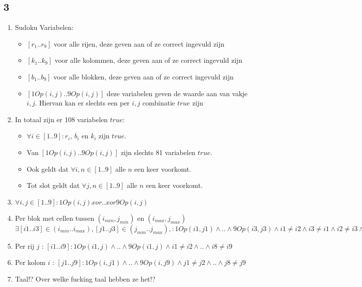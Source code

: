 \documentclass[]{article}
\begin{document}
  \subsection*{3}
  \begin{enumerate}[a]
    \item Sudoku Variabelen:
    \begin{itemize}
      \item $ [r_1 .. r_9] $ voor alle rijen, deze geven aan of ze correct ingevuld zijn
      \item $ [k_1 .. k_9] $ voor alle kolommen, deze geven aan of ze correct ingevuld zijn
      \item $ [b_1 .. b_9] $ voor alle blokken, deze geven aan of ze correct ingevuld zijn
      \item $ [1Op(i,j) .. 9Op(i,j)] $ deze variabelen geven de waarde aan van vakje $i,j$. Hiervan kan er slechts een per $i,j$ combinatie $true$ zijn
    \end{itemize}
    \item In totaal zijn er 108 variabelen $true$:
    \begin{itemize}
      \item $ \forall i \in [1..9] : r_i $, $b_i$ en $k_i$ zijn $true$.
      \item Van $ [1Op(i,j) .. 9Op(i,j)] $ zijn slechts 81 variabelen $true$.
      \item Ook geldt dat $\forall i,n \in [1..9]$ alle $n$ een keer voorkomt.
      \item Tot slot geldt dat $\forall j,n \in [1..9]$ alle $n$ een keer voorkomt.
    \end{itemize}
    \item $\forall i,j \in [1..9]: 1Op(i,j) xor .. xor 9Op(i,j) $
    \item Per blok met cellen tussen $(i_{min},j_{min})$ en $(i_{max},j_{max})$
    $ \exists [i1..i3]\in(i_{min} .. i_{max}), [j1..j3]\in (j_{min} .. j_{max}), : 1Op(i1,j1) \land .. \land 9Op(i3,j3) \land i1 \neq i2 \land i3 \neq i1 \land i2 \neq i3
    \land j1 \neq j2 \land j3 \neq j1 \land j2 \neq j3 $ %
    \item Per rij $j$ : $ [i1..i9] : 1Op(i1,j) \land .. \land 9Op(i1,j) \land i1 \neq i2 \land .. \land i8 \neq i9 $
    \item Per kolom $i$ : $[j1..j9] : 1Op(i,j1) \land .. \land 9Op(i,j9) \land j1 \neq j2 \land .. \land j8 \neq j9 $
    \item Taal!? Over welke fucking taal hebben ze het!?
  \end{enumerate}
\end{document}
